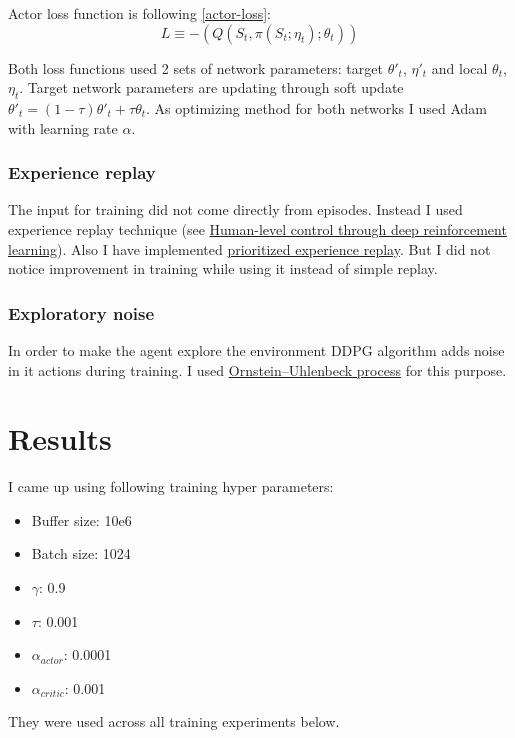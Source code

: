 \documentclass{report}
\begin{document}
Actor loss function is following \ref{actor-loss}:
\begin{equation} \label{actor-loss}
L \equiv -(Q(S_t, \pi(S_t; \eta_t); \theta_t))
\end{equation}

Both loss functions used 2 sets of network parameters: target \(\theta'_t\), \(\eta'_t\) and local \(\theta_t\), \(\eta_t\). Target network parameters are updating through soft update \(\theta'_t = (1 - \tau) \theta'_t + \tau \theta_t\).
As optimizing method for both networks I used Adam with learning rate \(\alpha\).

\subsubsection*{Experience replay}
The input for training did not come directly from episodes. Instead I used experience replay technique (see \href{https://storage.googleapis.com/deepmind-media/dqn/DQNNaturePaper.pdf}{Human-level control through deep reinforcement learning}).
Also I have implemented \href{https://arxiv.org/pdf/1511.05952.pdf}{prioritized experience replay}. But I did not notice improvement in training while using it instead of simple replay.

\subsubsection*{Exploratory noise}
In order to make the agent explore the environment DDPG algorithm adds noise in it actions during training. I used \href{https://en.wikipedia.org/wiki/Ornstein-Uhlenbeck_process}{Ornstein–Uhlenbeck process} for this purpose.


\section*{Results}

I came up using following training hyper parameters:
\begin{itemize}
	\item Buffer size: 10e6
	\item Batch size: 1024
	\item \(\gamma\): 0.9
	\item \(\tau\): 0.001
	\item \(\alpha_{actor}\): 0.0001
	\item \(\alpha_{critic}\): 0.001
\end{itemize}
They were used across all training experiments below.
\end{document}
